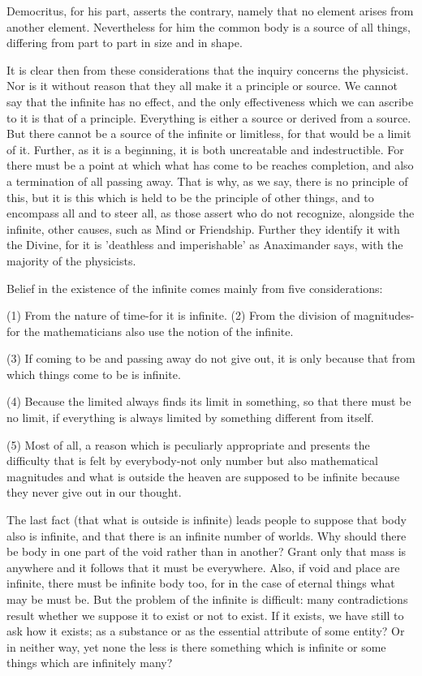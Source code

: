 Democritus, for his part, asserts the contrary, namely that no element
arises from another element. Nevertheless for him the common body
is a source of all things, differing from part to part in size and
in shape. 

It is clear then from these considerations that the inquiry concerns
the physicist. Nor is it without reason that they all make it a principle
or source. We cannot say that the infinite has no effect, and the
only effectiveness which we can ascribe to it is that of a principle.
Everything is either a source or derived from a source. But there
cannot be a source of the infinite or limitless, for that would be
a limit of it. Further, as it is a beginning, it is both uncreatable
and indestructible. For there must be a point at which what has come
to be reaches completion, and also a termination of all passing away.
That is why, as we say, there is no principle of this, but it is this
which is held to be the principle of other things, and to encompass
all and to steer all, as those assert who do not recognize, alongside
the infinite, other causes, such as Mind or Friendship. Further they
identify it with the Divine, for it is 'deathless and imperishable'
as Anaximander says, with the majority of the physicists.

Belief in the existence of the infinite comes mainly from five considerations:

(1) From the nature of time-for it is infinite. 
(2) From the division of magnitudes-for the mathematicians also use
the notion of the infinite. 

(3) If coming to be and passing away do not give out, it is only because
that from which things come to be is infinite. 

(4) Because the limited always finds its limit in something, so that
there must be no limit, if everything is always limited by something
different from itself. 

(5) Most of all, a reason which is peculiarly appropriate and presents
the difficulty that is felt by everybody-not only number but also
mathematical magnitudes and what is outside the heaven are supposed
to be infinite because they never give out in our thought.

The last fact (that what is outside is infinite) leads people to suppose
that body also is infinite, and that there is an infinite number of
worlds. Why should there be body in one part of the void rather than
in another? Grant only that mass is anywhere and it follows that it
must be everywhere. Also, if void and place are infinite, there must
be infinite body too, for in the case of eternal things what may be
must be. But the problem of the infinite is difficult: many contradictions
result whether we suppose it to exist or not to exist. If it exists,
we have still to ask how it exists; as a substance or as the essential
attribute of some entity? Or in neither way, yet none the less is
there something which is infinite or some things which are infinitely
many? 

